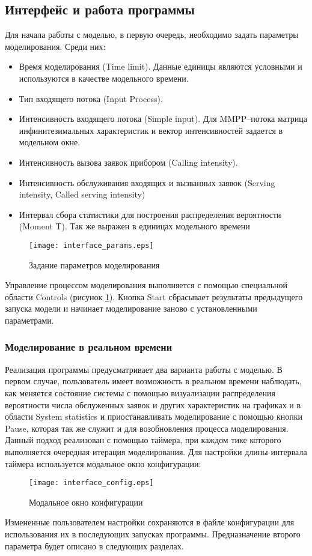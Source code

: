 \subsection{Интерфейс и работа программы}
Для начала работы с моделью, в первую очередь, необходимо задать параметры моделирования. Среди них:
\begin{itemize}
	\item Время моделирования (Time limit). Данные единицы являются условными и используются в качестве модельного времени.
	\item Тип входящего потока (Input Process).
	\item Интенсивность входящего потока (Simple input). Для MMPP--потока матрица инфинитезимальных характеристик и вектор интенсивностей задается в модельном окне.
	\item Интенсивность вызова заявок прибором (Calling intensity).
	\item Интенсивность обслуживания входящих и вызванных заявок (Serving intensity, Called serving intensity)
	\item Интервал сбора статистики для построения распределения вероятности (Moment T). Так же выражен в единицах модельного времени
\end{itemize}
   \begin{figure}[H]
	\centering
	\texttt{[image: interface\_params.eps]}
	\caption{Задание параметров моделирования}
	\label{interface_params}
\end{figure}
Управление процессом моделирования выполняется с помощью специальной области Controls (рисунок \ref{interface_params}). Кнопка Start сбрасывает результаты предыдущего запуска модели и начинает моделирование заново с установленными параметрами.
\subsubsection{Моделирование в реальном времени}
Реализация программы предусматривает два варианта работы с моделью. В первом случае, пользователь имеет возможность в реальном времени наблюдать, как меняется состояние системы с помощью визуализации распределения вероятности числа обслуженных заявок и других характеристик на графиках и в области System statistics и приостанавливать моделирование с помощью кнопки Pause, которая так же служит и для возобновления процесса моделирования. Данный подход реализован с помощью таймера, при каждом тике которого выполняется очередная итерация моделирования. Для настройки длины интервала таймера используется модальное окно конфигурации:
\begin{figure}[H]
	\centering
	\texttt{[image: interface\_config.eps]}
	\caption{Модальное окно конфигурации}
	\label{interface_config}
\end{figure}
Измененные пользователем настройки сохраняются в файле конфигурации для использования их в последующих запусках программы. Предназначение второго параметра будет описано в следующих разделах.

